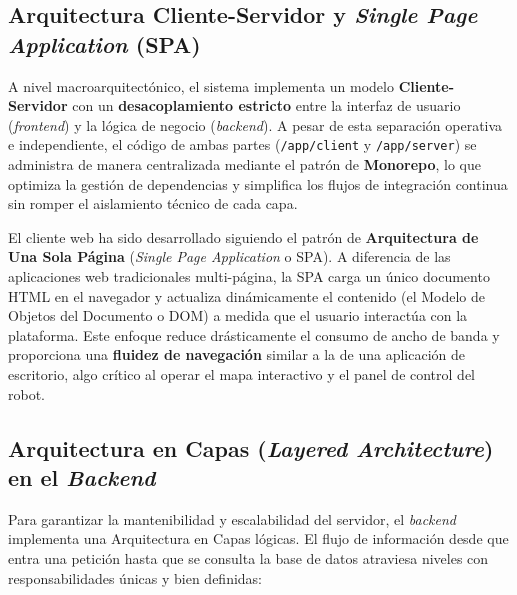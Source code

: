 \subsection{Arquitectura Cliente-Servidor y \textit{Single Page Application} (SPA)}

A nivel macroarquitectónico, el sistema implementa un modelo \textbf{Cliente-Servidor} con un \textbf{desacoplamiento estricto} entre la interfaz de usuario (\textit{frontend}) y la lógica de negocio (\textit{backend}). A pesar de esta separación operativa e independiente, el código de ambas partes (\texttt{/app/client} y \texttt{/app/server}) se administra de manera centralizada mediante el patrón de \textbf{Monorepo}, lo que optimiza la gestión de dependencias y simplifica los flujos de integración continua sin romper el aislamiento técnico de cada capa.

El cliente web ha sido desarrollado siguiendo el patrón de \textbf{Arquitectura de Una Sola Página} (\textit{Single Page Application} o SPA). A diferencia de las aplicaciones web tradicionales multi-página, la SPA carga un único documento HTML en el navegador y actualiza dinámicamente el contenido (el Modelo de Objetos del Documento o DOM) a medida que el usuario interactúa con la plataforma. Este enfoque reduce drásticamente el consumo de ancho de banda y proporciona una \textbf{fluidez de navegación} similar a la de una aplicación de escritorio, algo crítico al operar el mapa interactivo y el panel de control del robot.


\subsection{Arquitectura en Capas (\textit{Layered Architecture}) en el \textit{Backend}}

Para garantizar la mantenibilidad y escalabilidad del servidor, el \textit{backend} implementa una Arquitectura en Capas lógicas. El flujo de información desde que entra una petición hasta que se consulta la base de datos atraviesa niveles con responsabilidades únicas y bien definidas:



